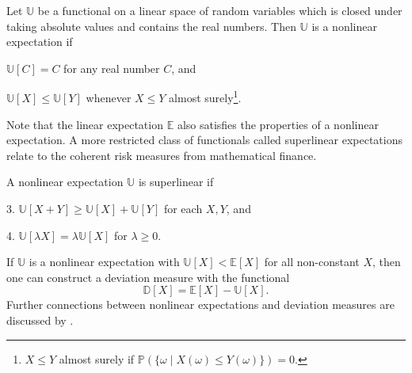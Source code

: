 \documentclass[main.tex]{subfiles}
\begin{document}
\begin{mydef}
  Let $\mathbb{U}$ be a functional on a linear space of random
  variables which is closed under taking absolute values and contains
  the real numbers.
  Then $\mathbb{U}$ is a nonlinear expectation if
  \begin{enumerate}
    \begin{samepage}
    \item $\mathbb{U}[C] = C$ for any real number $C$, and
    \item $\mathbb{U}[X]\leq \mathbb{U}[Y]$ whenever $X\leq Y$ almost
      surely\footnote{$X\leq Y$ almost surely if
        $\mathbb{P}(\{\omega\mid X(\omega)\leq Y(\omega)\})=0$.}.
    \end{samepage}
  \end{enumerate}
\end{mydef}
Note that the linear expectation $\mathbb{E}$ also satisfies
the properties of a nonlinear expectation.
A more restricted class of functionals called superlinear expectations
relate to the coherent risk measures from mathematical finance.
\begin{mydef}
  A nonlinear expectation $\mathbb{U}$ is superlinear if
  \begin{enumerate}
    \begin{samepage}
    \item[3.] $\mathbb{U}[X+Y]\geq \mathbb{U}[X] +\mathbb{U}[Y]$ for
      each $X,Y$, and
    \item[4.] $\mathbb{U}[\lambda X] = \lambda\mathbb{U}[X]$ for
      $\lambda\geq 0$.
    \end{samepage}
  \end{enumerate}
\end{mydef}

If $\mathbb{U}$ is a nonlinear expectation
with $\mathbb{U}[X] < \mathbb{E}[X]$ for all non-constant $X$,
then one can
construct a deviation measure with the functional
\begin{equation}
  \mathbb{D}[X]=\mathbb{E}[X]-\mathbb{U}[X].
\end{equation}
Further connections between nonlinear expectations and deviation
measures are discussed by \citet{rockafellar2013fundamental}.
\end{document}
